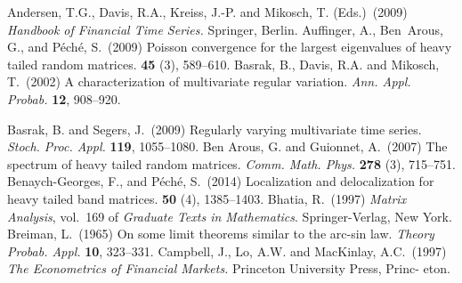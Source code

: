 \documentclass[leqno,10pt]{amsart}
\newcommand{\1}{{\bf 1}}
\newcommand{\8}{\infty}
\begin{document}
\begin{thebibliography}{99}
\baselineskip12pt
{\sc Andersen, T.G., Davis, R.A., Kreiss, J.-P. and Mikosch, T. (Eds.)}\ (2009)
{\em Handbook of Financial Time Series.} Springer, Berlin.
{\sc Auffinger, A., Ben~Arous, G., and P{\'e}ch{\'e}, S.}\ (2009)
\newblock Poisson convergence for the largest eigenvalues of heavy tailed
  random matrices.
 \textbf{45} (3),
  589--610.
{\sc Basrak, B., Davis, R.A. and Mikosch, T.}\ (2002)
A characterization of multivariate regular variation.
{\em Ann. Appl. Probab.}  {\bf 12}, 908--920.

{\sc Basrak, B. and Segers, J.}\ (2009) Regularly varying multivariate time
series. {\em Stoch. Proc. Appl.} {\bf 119}, 1055--1080.
{\sc Ben Arous, G. and Guionnet, A.}\ (2007) The spectrum of heavy tailed random matrices. {\em Comm. Math. Phys.} {\bf 278} (3), 715--751.
{\sc Benaych-Georges, F., and P{\'e}ch{\'e}, S.}\ (2014)
\newblock Localization and delocalization for heavy tailed band matrices.
 \textbf{50} (4),
  1385--1403.
{\sc Bhatia, R.}\ (1997)
{\em Matrix Analysis}, vol.~169 of {\em Graduate Texts in
  Mathematics}. Springer-Verlag, New York.
{\sc Breiman, L.}\ (1965)
On some limit theorems similar to the arc-sin law. {\em Theory
Probab. Appl.} {\bf 10}, 323--331.
{\sc Campbell, J., Lo, A.W. and MacKinlay, A.C.}\ (1997)
{\em The Econometrics of Financial Markets.} Princeton University Press, Princ-
eton.


\end{thebibliography}
\end{document}
